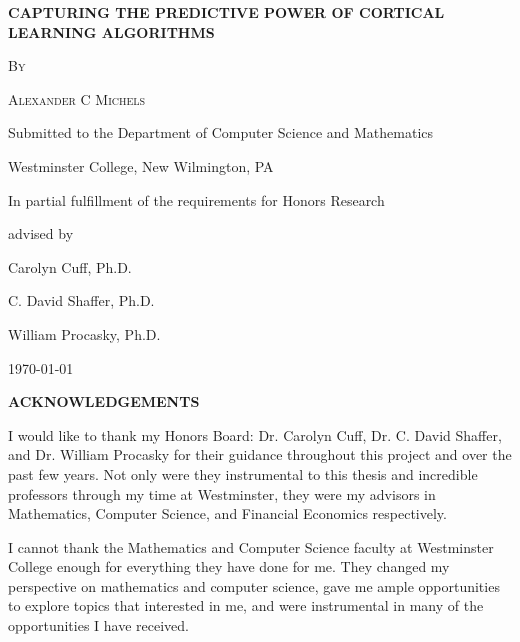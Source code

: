 \documentclass[oneside,12pt,openany]{book}
\renewcommand{\baselinestretch}{1.5}
\begin{document}
	\frontmatter
	\begin{titlepage}
		\centering
		{\scshape\Large \textbf{CAPTURING THE PREDICTIVE POWER OF CORTICAL LEARNING ALGORITHMS} \par}
		\vspace{5.5cm}
		{\scshape\large By \par}
		{\scshape\large Alexander C Michels\par}
		\vfill
		{\large Submitted to the Department of Computer Science and Mathematics\par}
		{\large Westminster College, New Wilmington, PA\par}
		{\large In partial fulfillment of the requirements for Honors Research\par}

		\vfill
		advised by\par
		\large
		Carolyn Cuff, Ph.D.\par
		C. David Shaffer, Ph.D.\par
		William Procasky, Ph.D.\par
		
		\vfill
		
		{\large \today\par}
	\end{titlepage}
	\renewcommand{\baselinestretch}{.7}
	\setcounter{tocdepth}{0}
	\tableofcontents
	\vfill
	\pagebreak
	
	\renewcommand{\baselinestretch}{1.5}
	
	\begin{center}
		\textbf{ACKNOWLEDGEMENTS}
	\end{center}

	I would like to thank my Honors Board: Dr. Carolyn Cuff, Dr. C. David Shaffer, and Dr. William Procasky for their guidance throughout this project and over the past few years. Not only were they instrumental to this thesis and incredible professors through my time at Westminster, they were my advisors in Mathematics, Computer Science, and Financial Economics respectively. 
	
	I cannot thank the Mathematics and Computer Science faculty at Westminster College enough for everything they have done for me. They changed my perspective on mathematics and computer science, gave me ample opportunities to explore topics that interested in me, and were instrumental in many of the opportunities I have received.
	
\end{document}
